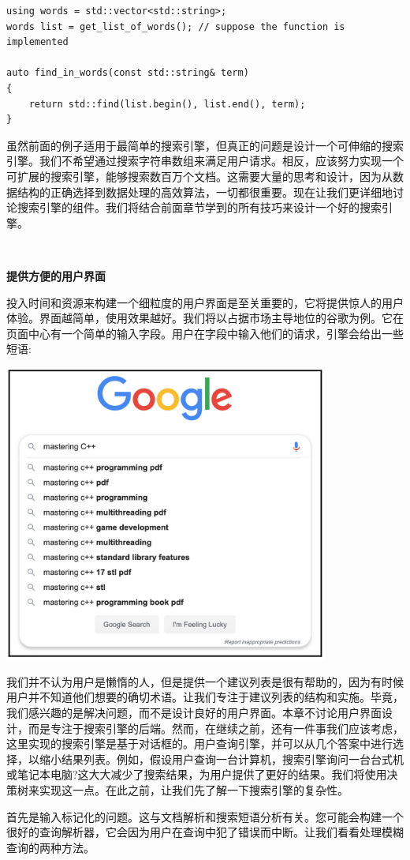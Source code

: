 \begin{lstlisting}[caption={}]
using words = std::vector<std::string>;
words list = get_list_of_words(); // suppose the function is implemented

auto find_in_words(const std::string& term)
{
	return std::find(list.begin(), list.end(), term);
}
\end{lstlisting}

虽然前面的例子适用于最简单的搜索引擎，但真正的问题是设计一个可伸缩的搜索引擎。我们不希望通过搜索字符串数组来满足用户请求。相反，应该努力实现一个可扩展的搜索引擎，能够搜索数百万个文档。这需要大量的思考和设计，因为从数据结构的正确选择到数据处理的高效算法，一切都很重要。现在让我们更详细地讨论搜索引擎的组件。我们将结合前面章节学到的所有技巧来设计一个好的搜索引擎。 \par

\noindent\textbf{}\ \par
\textbf{提供方便的用户界面} \ \par
投入时间和资源来构建一个细粒度的用户界面是至关重要的，它将提供惊人的用户体验。界面越简单，使用效果越好。我们将以占据市场主导地位的谷歌为例。它在页面中心有一个简单的输入字段。用户在字段中输入他们的请求，引擎会给出一些短语: \par

\begin{center}
	\includegraphics[width=0.8\textwidth]{content/Section-3/Chapter-16/3}
\end{center}

我们并不认为用户是懒惰的人，但是提供一个建议列表是很有帮助的，因为有时候用户并不知道他们想要的确切术语。让我们专注于建议列表的结构和实施。毕竟，我们感兴趣的是解决问题，而不是设计良好的用户界面。本章不讨论用户界面设计，而是专注于搜索引擎的后端。然而，在继续之前，还有一件事我们应该考虑，这里实现的搜索引擎是基于对话框的。用户查询引擎，并可以从几个答案中进行选择，以缩小结果列表。例如，假设用户查询一台计算机，搜索引擎询问一台台式机或笔记本电脑?这大大减少了搜索结果，为用户提供了更好的结果。我们将使用决策树来实现这一点。在此之前，让我们先了解一下搜索引擎的复杂性。 \par
首先是输入标记化的问题。这与文档解析和搜索短语分析有关。您可能会构建一个很好的查询解析器，它会因为用户在查询中犯了错误而中断。让我们看看处理模糊查询的两种方法。 \par


